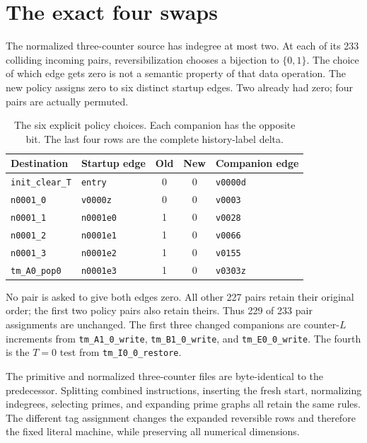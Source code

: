 \documentclass[11pt,a4paper]{article}
\numberwithin{equation}{section}
\newcommand{\code}[1]{\texttt{\small #1}}
\begin{document}
\section{The exact four swaps}
\label{fpa:st:sec:delta}
The normalized three-counter source has indegree at most two. At each of its
233 colliding incoming pairs, reversibilization chooses a bijection to
$\{0,1\}$. The choice of which edge gets zero is not a semantic property of
that data operation. The new policy assigns zero to six distinct startup
edges. Two already had zero; four pairs are actually permuted.

\begin{table}[htbp]
\centering\small
\begin{tabular}{@{}llccl@{}}
\toprule
Destination & Startup edge & Old & New & Companion edge\\
\midrule
\code{init\_clear\_T} & \code{entry} & 0 & 0 & \code{v0000d}\\
\code{n0001\_0} & \code{v0000z} & 0 & 0 & \code{v0003}\\
\code{n0001\_1} & \code{n0001e0} & 1 & 0 & \code{v0028}\\
\code{n0001\_2} & \code{n0001e1} & 1 & 0 & \code{v0066}\\
\code{n0001\_3} & \code{n0001e2} & 1 & 0 & \code{v0155}\\
\code{tm\_A0\_pop0} & \code{n0001e3} & 1 & 0 & \code{v0303z}\\
\bottomrule
\end{tabular}
\caption{The six explicit policy choices. Each companion has the opposite bit.
The last four rows are the complete history-label delta.}
\label{fpa:st:tab:swaps}
\end{table}

No pair is asked to give both edges zero. All other 227 pairs retain their
original order; the first two policy pairs also retain theirs. Thus 229 of
233 pair assignments are unchanged. The first three changed companions are
counter-$L$ increments from \code{tm\_A1\_0\_write},
\code{tm\_B1\_0\_write}, and \code{tm\_E0\_0\_write}. The fourth is
the $T=0$ test from \code{tm\_I0\_0\_restore}.

The primitive and normalized three-counter files are byte-identical to the
predecessor. Splitting combined instructions, inserting the fresh start,
normalizing indegrees, selecting primes, and expanding prime graphs all
retain the same rules. The different tag assignment changes the expanded
reversible rows and therefore the fixed literal machine, while preserving
all numerical dimensions.
\end{document}
